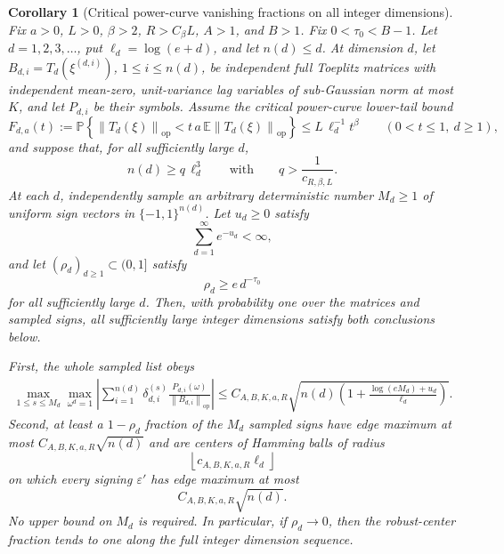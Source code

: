 \documentclass[11pt]{amsart}
\numberwithin{equation}{section}
\newtheorem{corollary}[theorem]{Corollary}
\theoremstyle{definition}
\theoremstyle{remark}
\newcommand{\op}{\mathrm{op}}
\newcommand{\Prob}{\mathbb P}
\newcommand{\Exp}{\mathbb E}
\newcommand{\norm}[1]{\left\lVert #1\right\rVert}
\newcommand{\eps}{\varepsilon}
\begin{document}
\begin{corollary}[Critical power-curve vanishing fractions on all integer dimensions]
\label{cor:normalizer-tail-power-borel-critical-vanishing-fractions}
Fix \(a>0\), \(L>0\), \(\beta>2\), \(R>C_\beta L\), \(A>1\), and
\(B>1\).  Fix \(0<\tau_0<B-1\).  Let \(d=1,2,3,\ldots\), put
\(\ell_d=\log(e+d)\), and let \(n(d)\le d\).  At dimension \(d\), let
\(B_{d,i}=T_d(\xi^{(d,i)})\), \(1\le i\le n(d)\), be independent full Toeplitz
matrices with independent mean-zero, unit-variance lag variables of
sub-Gaussian norm at most \(K\), and let \(P_{d,i}\) be their symbols.  Assume
the critical power-curve lower-tail bound
\[
  F_{d,a}(t):=
  \Prob\left\{\norm{T_d(\xi)}_{\op}
  <t\,a\,\Exp\norm{T_d(\xi)}_{\op}\right\}
  \le L\,\ell_d^{-1}t^\beta
  \qquad(0<t\le1,\ d\ge1),
\]
and suppose that, for all sufficiently large \(d\),
\[
  n(d)\ge q\,\ell_d^3
  \qquad\text{with}\qquad
  q>\frac1{c_{R,\beta,L}}.
\]
At each \(d\), independently sample an arbitrary deterministic number \(M_d\ge1\)
of uniform sign vectors in \(\{-1,1\}^{n(d)}\).  Let \(u_d\ge0\) satisfy
\[
  \sum_{d=1}^{\infty}e^{-u_d}<\infty ,
\]
and let \((\rho_d)_{d\ge1}\subset(0,1]\) satisfy
\[
  \rho_d\ge e\,d^{-\tau_0}
\]
for all sufficiently large \(d\).  Then, with probability one over the matrices
and sampled signs, all sufficiently large integer dimensions satisfy both
conclusions below.

First, the whole sampled list obeys
\[
\begin{aligned}
  \max_{1\le s\le M_d}\max_{\omega^d=1}
  \left|\sum_{i=1}^{n(d)}\delta_{d,i}^{(s)}
  \frac{P_{d,i}(\omega)}{\norm{B_{d,i}}_{\op}}\right|
  \le
  C_{A,B,K,a,R}\sqrt{
    n(d)\left(1+\frac{\log(eM_d)+u_d}{\ell_d}\right)} .
\end{aligned}
\]
Second, at least a \(1-\rho_d\) fraction of the \(M_d\) sampled signs have edge
maximum at most \(C_{A,B,K,a,R}\sqrt{n(d)}\) and are centers of Hamming balls of
radius
\[
  \left\lfloor c_{A,B,K,a,R}\ell_d\right\rfloor
\]
on which every signing \(\eps'\) has edge maximum at most
\[
  C_{A,B,K,a,R}\sqrt{n(d)}.
\]
No upper bound on \(M_d\) is required.  In particular, if \(\rho_d\to0\), then
the robust-center fraction tends to one along the full integer dimension
sequence.
\end{corollary}
\end{document}
